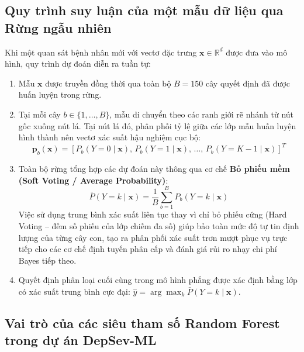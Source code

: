 \subsection{Quy trình suy luận của một mẫu dữ liệu qua Rừng ngẫu nhiên}
\label{subsec:rf-inference-pipeline}

Khi một quan sát bệnh nhân mới với vectơ đặc trưng $\mathbf{x} \in \mathbb{R}^d$ được đưa vào mô hình, quy trình dự đoán diễn ra tuần tự:
\begin{enumerate}
    \item Mẫu $\mathbf{x}$ được truyền đồng thời qua toàn bộ $B = 150$ cây quyết định đã được huấn luyện trong rừng.
    \item Tại mỗi cây $b \in \{1, \dots, B\}$, mẫu di chuyển theo các ranh giới rẽ nhánh từ nút gốc xuống nút lá. Tại nút lá đó, phân phối tỷ lệ giữa các lớp mẫu huấn luyện hình thành nên vectơ xác suất hậu nghiệm cục bộ:
    \begin{equation}
        \mathbf{p}_b(\mathbf{x}) = \left[ P_b(Y = 0 \mid \mathbf{x}), \, P_b(Y = 1 \mid \mathbf{x}), \, \dots, \, P_b(Y = K-1 \mid \mathbf{x}) \right]^T
    \end{equation}
    \item Toàn bộ rừng tổng hợp các dự đoán này thông qua cơ chế \textbf{Bỏ phiếu mềm (Soft Voting / Average Probability)}:
    \begin{equation}
        \bar{P}(Y = k \mid \mathbf{x}) = \frac{1}{B} \sum_{b=1}^B P_b(Y = k \mid \mathbf{x})
    \end{equation}
    Việc sử dụng trung bình xác suất liên tục thay vì chỉ bỏ phiếu cứng (Hard Voting -- đếm số phiếu của lớp chiếm đa số) giúp bảo toàn mức độ tự tin định lượng của từng cây con, tạo ra phân phối xác suất trơn mượt phục vụ trực tiếp cho các cơ chế định tuyến phân cấp và đánh giá rủi ro nhạy chi phí Bayes tiếp theo.
    \item Quyết định phân loại cuối cùng trong mô hình phẳng được xác định bằng lớp có xác suất trung bình cực đại: $\hat{y} = \arg\max_k \bar{P}(Y = k \mid \mathbf{x})$.
\end{enumerate}

\subsection{Vai trò của các siêu tham số Random Forest trong dự án DepSev-ML}
\label{subsec:rf-hyperparameters-role}

